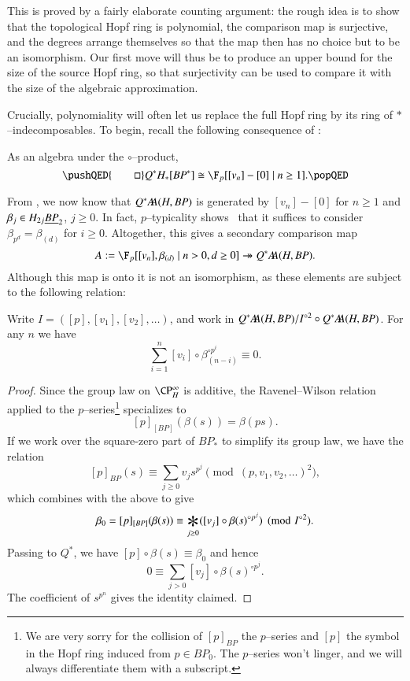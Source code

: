 \noindent This is proved by a fairly elaborate counting argument: the rough idea is to show that the topological Hopf ring is polynomial, the comparison map is surjective, and the degrees arrange themselves so that the map then has no choice but to be an isomorphism.  Our first move will thus be to produce an upper bound for the size of the source Hopf ring, so that surjectivity can be used to compare it with the size of the algebraic approximation.

Crucially, polynomiality will often let us replace the full Hopf ring by its ring of $\ast$--indecomposables.  To begin, recall the following consequence of :

\begin{corollary}
As an algebra under the $\circ$--product,
\[\pushQED{\qed}
Q^* H_*[BP^*] \cong \F_p[[v_n] - [0] \mid n \ge 1]. \qedhere
\popQED\]
\end{corollary}

\noindent From , we now know that $Q^* \AA(H, BP)$ is generated by $[v_n] - [0]$ for $n \ge 1$ and $\beta_j \in H_{2j} \OS{BP}{2}$, $j \ge 0$.  In fact, $p$--typicality shows~\cite[Lemma 4.14]{RavenelWilsonHopfRingForMU} that it suffices to consider $\beta_{p^d} = \beta_{(d)}$ for $i \ge 0$.  Altogether, this gives a secondary comparison map \[A := \F_p[[v_n], \beta_{(d)} \mid n > 0, d \ge 0] \onto Q^* \AA(H, BP).\]  Although this map is onto it is not an isomorphism, as these elements are subject to the following relation:

\begin{lemma}
Write $I = ([p], [v_1], [v_2], \ldots)$, and work in $Q^* \AA(H, BP) / I^{\circ 2} \circ Q^* \AA(H, BP)$.  For any $n$ we have \[\sum_{i=1}^n [v_i] \circ \beta_{(n-i)}^{\circ p^i} \equiv 0.\]
\end{lemma}
\begin{proof}
Since the group law on $\CP^\infty_H$ is additive, the Ravenel--Wilson relation applied to the $p$--series\footnote{We are very sorry for the collision of $[p]_{BP}$ the $p$--series and $[p]$ the symbol in the Hopf ring induced from $p \in BP_0$.  The $p$--series won't linger, and we will always differentiate them with a subscript.} specializes to \[[p]_{[BP]}(\beta(s)) = \beta(ps).\]  If we work over the square-zero part of $BP_*$ to simplify its group law, we have the relation \[[p]_{BP}(s) \equiv \sum_{j \ge 0} v_j s^{p^j} \pmod{(p, v_1, v_2, \ldots)^2},\] which combines with the above to give \[\beta_0 = [p]_{[BP]}(\beta(s)) \equiv \bigast_{j \ge 0} ([v_j] \circ \beta(s)^{\circ p^j}) \pmod{I^{\circ 2}}.\]  Passing to $Q^*$, we have $[p] \circ \beta(s) \equiv \beta_0$ and hence \[0 \equiv \sum_{j > 0} [v_j] \circ \beta(s)^{\circ p^j}.\]  The coefficient of $s^{p^n}$ gives the identity claimed.
\end{proof}

